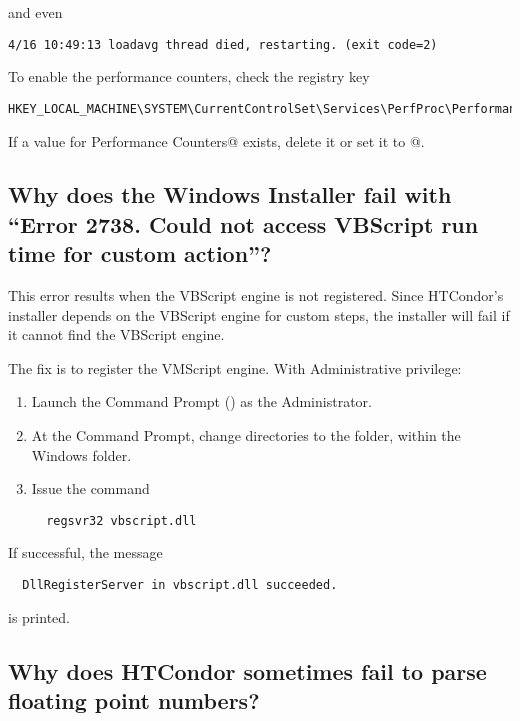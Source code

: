 and even

\footnotesize
\begin{verbatim}
4/16 10:49:13 loadavg thread died, restarting. (exit code=2)
\end{verbatim}
\normalsize

To enable the performance counters, check the registry key
\footnotesize
\begin{verbatim}
HKEY_LOCAL_MACHINE\SYSTEM\CurrentControlSet\Services\PerfProc\Performance
\end{verbatim}
\normalsize
If a value for \verb@Disable Performance Counters@ exists, delete it or set
it to @.

\subsection*{Why does the Windows Installer fail with ``Error 2738. Could not access VBScript run time for custom action''?}

This error results when the VBScript engine is not registered.
Since HTCondor's installer depends on the VBScript engine for custom steps,
the installer will fail if it cannot find the VBScript engine.

The fix is to register the VMScript engine.
With Administrative privilege:

\begin{enumerate}
\item Launch the Command Prompt () as the Administrator. 
\item At the Command Prompt, change directories to the  folder, 
within the Windows folder.
\item Issue the command 
\begin{verbatim}
  regsvr32 vbscript.dll
\end{verbatim}
\end{enumerate}

If successful, the message
\begin{verbatim}
  DllRegisterServer in vbscript.dll succeeded.  
\end{verbatim}
is printed.

\subsection*{Why does HTCondor sometimes fail to parse floating point numbers?}

